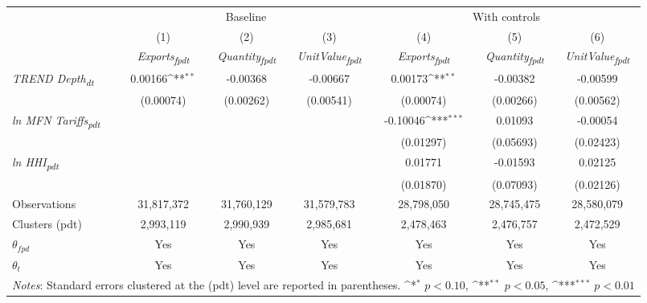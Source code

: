 {
\def\sym#1{\ifmmode^{#1}\else\(^{#1}\)\fi}
\begin{tabular}{l*{6}{c}}
\toprule
&\multicolumn{3}{c}{Baseline}&\multicolumn{3}{c}{With controls}\\\cmidrule(lr){2-4}\cmidrule(lr){5-7}
&(1)&(2)&(3)&(4)&(5)&(6)\\
&\textit{Exports\textsubscript{fpdt}}&\textit{Quantity\textsubscript{fpdt}}&\textit{UnitValue\textsubscript{fpdt}}&\textit{Exports\textsubscript{fpdt}}&\textit{Quantity\textsubscript{fpdt}}&\textit{UnitValue\textsubscript{fpdt}}\\
\midrule
\textit{TREND Depth\textsubscript{dt}} & 0.00166\sym{**} & -0.00368 & -0.00667 & 0.00173\sym{**} & -0.00382 & -0.00599\\
  & (0.00074) & (0.00262) & (0.00541) & (0.00074) & (0.00266) & (0.00562)\\
\addlinespace
\textit{ln MFN Tariffs\textsubscript{pdt}} &  &  &  & -0.10046\sym{***} & 0.01093 & -0.00054\\
  &  &  &  & (0.01297) & (0.05693) & (0.02423)\\
\addlinespace
\textit{ln HHI\textsubscript{pdt}} &  &  &  & 0.01771 & -0.01593 & 0.02125\\
  &  &  &  & (0.01870) & (0.07093) & (0.02126)\\
\midrule
Observations & 31,817,372 & 31,760,129 & 31,579,783 & 28,798,050 & 28,745,475 & 28,580,079\\
Clusters (pdt) & 2,993,119 & 2,990,939 & 2,985,681 & 2,478,463 & 2,476,757 & 2,472,529\\
$\theta_{fpd}$ & Yes & Yes & Yes & Yes & Yes & Yes\\
$\theta_{t}$ & Yes & Yes & Yes & Yes & Yes & Yes\\
\bottomrule
\multicolumn{7}{l}{\footnotesize \textit{Notes}: Standard errors clustered at the (pdt) level are reported in parentheses. \sym{*} \(p<0.10\), \sym{**} \(p<0.05\), \sym{***} \(p<0.01\)}\\
\end{tabular}
}
